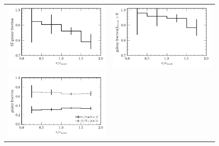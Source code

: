 \documentclass[a4paper,fleqn,usenatbib,letter]{mnras}
\begin{document}
\begin{figure}	
	\begin{tabular}{cc}
	\includegraphics[width=\columnwidth]{plots_parent_sample/SFgal_fraction.png} &
	\includegraphics[width=\columnwidth]{plots_parent_sample/gasgal_fraction.png}\\
	\includegraphics[width=\columnwidth]{plots_parent_sample/discgal_fraction.png} &

\end{tabular}
\end{figure}
\end{document}
